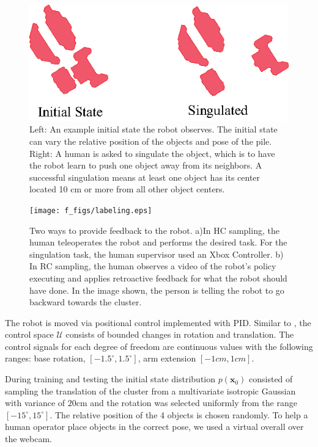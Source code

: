 \documentclass[10pt, conference]{ieeeconf}      %
\newcommand{\bx}{\mathbf{x}}
\begin{document}
\begin{figure}
\centering
\includegraphics{f_figs/singulation.eps}
\caption{
    \footnotesize
Left: An example initial state the robot observes. The initial state can vary the relative position of the objects and pose of the pile. Right: A human is asked to singulate the object, which is to have the robot learn to push one object away from its neighbors. A successful singulation means at least one object has its center located 10 cm or more from all other object centers.   }

\label{fig:izzy_sing}
\end{figure}


\begin{figure}
\centering
\texttt{[image: f\_figs/labeling.eps]}
\caption{
    \footnotesize
Two ways to provide feedback to the robot. a)In HC sampling, the human teleoperates the robot and performs the desired task. For the singulation task, the human supervisor used an Xbox Controller. b) In RC sampling, the human observes a video of the robot's policy executing and applies retroactive feedback for what the robot should have done. In the image shown, the person is telling the robot to go backward towards the cluster.  }
\vspace{-20pt}
\label{fig:labeling}
\end{figure}

The robot is moved via positional control implemented with PID. Similar to \cite{laskeyshiv}, the control space $\mathcal{U}$ consists of bounded changes in rotation and translation. The control signals for each degree of freedom are continuous values with the following ranges: base rotation, $[-1.5^\circ,1.5^\circ]$, arm extension $[-1cm,1cm]$.

During training and testing the initial state distribution $p(\bx_0)$ consisted of sampling the translation of the cluster from a multivariate isotropic Gaussian with variance of $20$cm and the rotation was selected uniformly from the range $[-15^\circ,15^\circ]$. The relative position of the 4 objects is chosen randomly. To help a human operator place objects in the correct pose, we used a virtual overall over the webcam.   
\end{document}
